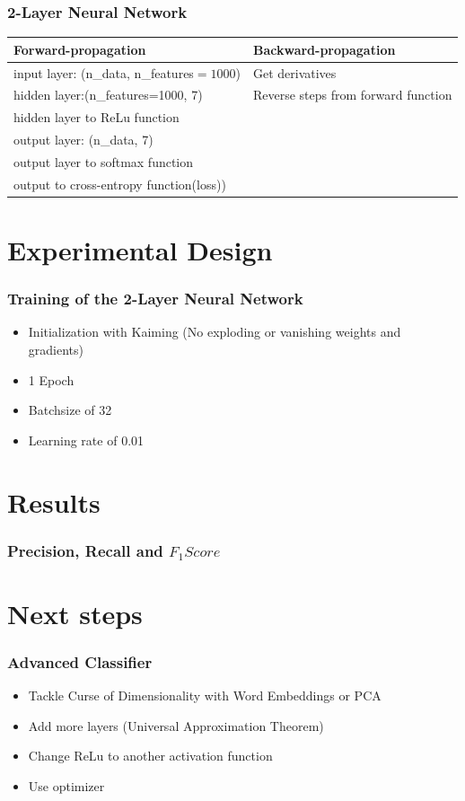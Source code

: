 \documentclass[aspectratio=169]{beamer}
\begin{document}
\begin{frame}
\frametitle{2-Layer Neural Network}
\begin{tabular}{m{6.5cm}|m{6.5cm}}                          
Forward-propagation & Backward-propagation \\
\midrule

input layer: (n\_data, n\_features$=1000$) & Get derivatives\\
hidden layer:(n\_features=1000, 7) & Reverse steps from forward function  \\
hidden layer to ReLu function & \\
output layer: (n\_data, 7) & \\
output layer to softmax function  & \\
output to cross-entropy function(loss))&

\end{tabular}

\end{frame}



\section{Experimental Design}
\begin{frame}
\frametitle{Training of the 2-Layer Neural Network}

\begin{itemize}

\item Initialization with Kaiming (No exploding or vanishing weights and gradients)
\item 1 Epoch
\item Batchsize of 32
\item Learning rate of 0.01

\end{itemize}

\end{frame}

\section{Results}
\begin{frame}
\frametitle{Precision, Recall and $F_1Score$}
\end{frame}

\section{Next steps}

\begin{frame}
\frametitle{Advanced Classifier}
\begin{itemize}
\item Tackle Curse of Dimensionality with Word Embeddings or PCA
\item Add more layers (Universal Approximation Theorem)
\item Change ReLu to another activation function
\item Use optimizer
\end{itemize}
\end{frame}
\end{document}
